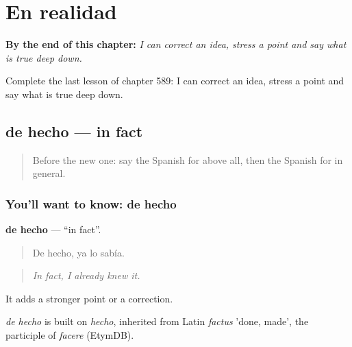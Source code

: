
\chapter{En realidad}
\label{ch:es-en-realidad}

\begin{chapteropening}
\textbf{By the end of this chapter:} \emph{I can correct an idea, stress a point and say what is true deep down.}

Complete the last lesson of chapter 589: I can correct an idea, stress a point and say what is true deep down.
\end{chapteropening}

\section[de hecho]{de hecho — in fact}

\label{lesson:ES-C589-de-hecho}



\begin{quote}
Before the new one: say the Spanish for above all, then the Spanish for in general.
\end{quote}

\subsection*{You'll want to know: de hecho}
\textbf{de hecho} — \textquotedblleft{}in fact\textquotedblright{}.

\begin{quote}
De hecho, ya lo sabía.
\end{quote}

\begin{quote}
\emph{In fact, I already knew it.}
\end{quote}

It adds a stronger point or a correction.

\begin{cousinweb}
\emph{de hecho} is built on \emph{hecho}, inherited from Latin \emph{factus} 'done, made', the participle of \emph{facere} (EtymDB).
\end{cousinweb}

